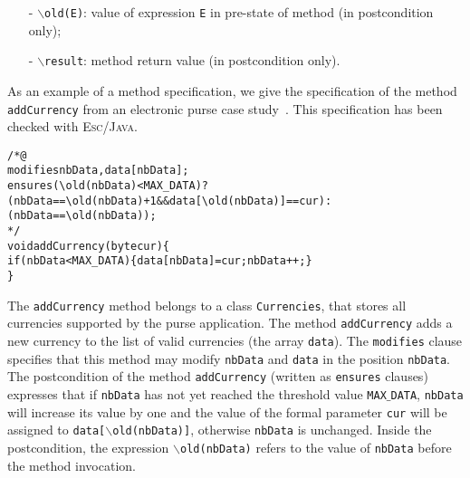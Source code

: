 \documentclass[a4paper]{llncs}
\newcommand{\escj}{\textsc{Esc/Java}}
\begin{document}
\begin{itemize}
\begin{itemize}
\item[-]{\texttt{$\backslash$old(E)}}: 
value of expression \texttt{E} in pre-state of method
(in postcondition only);
 
\item[-] {\tt$\backslash$result}: method return value (in postcondition
only).
\end{itemize} 
\end{itemize} 

As an example of a method specification, we give the
specification of the method \texttt{addCurrency} from an electronic
purse case study~\cite{CatanoH02a}. This specification has been
checked with \escj.
\begin{alltt}
/*@
  modifies nbData, data[nbData];
  ensures (\verb!\!old(nbData) < MAX_DATA) ?
      (nbData == \verb!\!old(nbData) + 1 && data[\verb!\!old(nbData)] == cur) :
      (nbData == \verb!\!old(nbData));
*/
void addCurrency(byte cur)\verb!{!
   if(nbData < MAX_DATA)\verb!{!data[nbData] = cur; nbData++;\verb!}!
\verb!}!
\end{alltt}
The \texttt{addCurrency} method belongs
to a class \texttt{Currencies}, that stores all currencies 
supported by the purse application. The method 
\texttt{addCurrency} adds a new currency to the list of valid 
currencies (the array \texttt{data}). The \texttt{modifies} clause
specifies that this method may modify \texttt{nbData} and 
\texttt{data} in the position \texttt{nbData}. The
postcondition of the method \texttt{addCurrency} (written as 
\texttt{ensures} clauses) expresses that if \texttt{nbData} has not 
yet reached the threshold value \texttt{MAX$\_$DATA}, \texttt{nbData} 
will increase its value by one and the value of the formal parameter 
\texttt{cur} will be assigned to
\texttt{data[\(\backslash\)old(nbData)]}, otherwise \texttt{nbData} is 
unchanged.  Inside the postcondition, the expression
\texttt{$\backslash$old(nbData)} refers to the value of 
\texttt{nbData} before the method invocation. 
\end{document}
